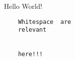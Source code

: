 \documentclass{scrartcl}\pagestyle{empty}
\begin{document}
    Hello
    World!

    \begin{verbatim}
    Whitespace  are
    relevant


    here!!!
    \end{verbatim}
\end{document}
